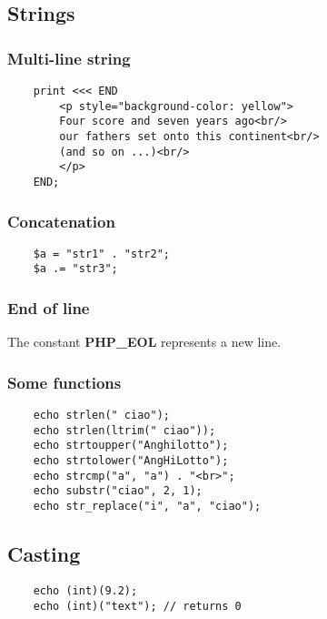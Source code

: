 \documentclass{article}
\begin{document}
\subsection{Strings}

\subsubsection{Multi-line string}

\begin{lstlisting}
    print <<< END
        <p style="background-color: yellow">
        Four score and seven years ago<br/>
        our fathers set onto this continent<br/>
        (and so on ...)<br/>
        </p>
    END;
\end{lstlisting}

\subsubsection{Concatenation}

\begin{lstlisting}
    $a = "str1" . "str2";
    $a .= "str3";
\end{lstlisting}

\subsubsection{End of line}

The constant \textbf{PHP\_EOL} represents a new line.

\subsubsection{Some functions}

\begin{lstlisting}
    echo strlen(" ciao");
    echo strlen(ltrim(" ciao"));
    echo strtoupper("Anghilotto");
    echo strtolower("AngHiLotto");
    echo strcmp("a", "a") . "<br>";
    echo substr("ciao", 2, 1);
    echo str_replace("i", "a", "ciao");
\end{lstlisting}

\subsection{Casting}

\begin{lstlisting}
    echo (int)(9.2);
    echo (int)("text"); // returns 0
\end{lstlisting}
\end{document}
